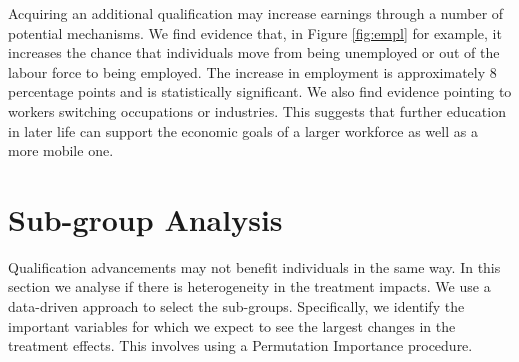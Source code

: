 \documentclass[12pt, a4paper]{article}
\begin{document}
Acquiring an additional qualification may increase earnings through a number of
potential mechanisms. We find evidence that, in Figure \ref{fig:empl} for
example, it increases the chance that individuals move from being unemployed or
out of the labour force to being employed. The increase in employment is
approximately 8 percentage points and is statistically significant. We also
find evidence pointing to workers switching occupations or industries. This
suggests that further education in later life can support the economic goals of
a larger workforce as well as a more mobile one.

%

\section{Sub-group Analysis}

Qualification advancements may not benefit individuals in the same way. In this section we analyse if there is heterogeneity in the treatment impacts. We use a data-driven approach to select the sub-groups. Specifically, we identify the important variables for which we expect to see the largest changes in the treatment effects. This involves using a Permutation Importance procedure.
%
%
\end{document}
